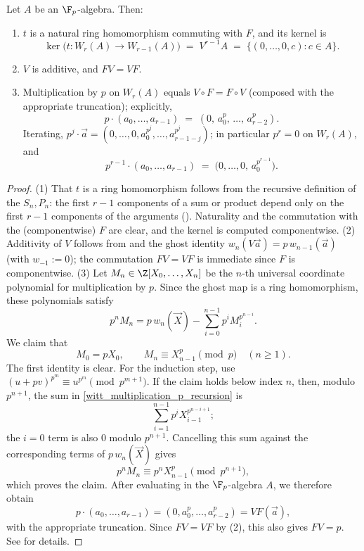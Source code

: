 \begin{prop}\label{prop:witt_multiplication_by_p}
Let $A$ be an $\F_p$-algebra. Then:
\begin{enumerate}
    \item $t$ is a natural ring homomorphism commuting with $F$, and its kernel is
    \[
    \ker\bigl(t \colon W_r(A) \to W_{r-1}(A)\bigr)
    \;=\; V^{r-1} A \;=\; \{(0, \dots, 0, c) : c \in A\}.
    \]
    \item $V$ is additive, and $F V = V F$.
    \item Multiplication by $p$ on $W_r(A)$ equals $V \circ F = F \circ V$
    (composed with the appropriate truncation); explicitly,
    \[
    p \cdot (a_0, \dots, a_{r-1}) \;=\; (0,\, a_0^p,\, \dots,\, a_{r-2}^p).
    \]
    Iterating, $p^j \cdot \vec a = (0, \dots, 0, a_0^{p^j}, \dots, a_{r-1-j}^{p^j})$;
    in particular $p^r = 0$ on $W_r(A)$, and
    \begin{equation}\label{eq:witt_p_to_r_minus_1}
    p^{r-1} \cdot (a_0, \dots, a_{r-1}) \;=\; \bigl(0, \dots, 0,\, a_0^{p^{r-1}}\bigr).
    \end{equation}
\end{enumerate}
\end{prop}

\begin{proof}
(1) That $t$ is a ring homomorphism follows from the recursive definition of the
$S_n, P_n$: the first $r-1$ components of a sum or product depend only on the first
$r-1$ components of the arguments (). Naturality and
the commutation with the (componentwise) $F$ are clear, and the kernel is computed
componentwise. (2) Additivity of $V$ follows from  and
the ghost identity $w_n(V\vec a) = p\, w_{n-1}(\vec a)$ (with $w_{-1} := 0$); the
commutation $FV = VF$ is immediate since $F$ is componentwise. (3) Let
$M_n\in\Z[X_0,\dots,X_n]$ be the $n$-th universal coordinate polynomial for
multiplication by $p$. Since the ghost map is a ring homomorphism, these
polynomials satisfy
\begin{equation}\label{eq:witt_multiplication_p_recursion}
 p^nM_n
 =p\,w_n(\vec X)-\sum_{i=0}^{n-1}p^iM_i^{p^{n-i}}.
\end{equation}
We claim that
\[
 M_0=pX_0,
 \qquad
 M_n\equiv X_{n-1}^p\pmod p\quad(n\geq1).
\]
The first identity is clear. For the induction step, use
$(u+pv)^{p^m}\equiv u^{p^m}\pmod{p^{m+1}}$. If the claim holds below index $n$,
then, modulo $p^{n+1}$, the sum in
\eqref{witt_multiplication_p_recursion} is
\[
 \sum_{i=1}^{n-1}p^iX_{i-1}^{p^{n-i+1}};
\]
the $i=0$ term is also $0$ modulo $p^{n+1}$. Cancelling this sum against the
corresponding terms of $p\,w_n(\vec X)$ gives
\[
 p^nM_n\equiv p^nX_{n-1}^p\pmod{p^{n+1}},
\]
which proves the claim. After evaluating in the $\F_p$-algebra $A$, we therefore
obtain
\[
 p\cdot(a_0,\dots,a_{r-1})=(0,a_0^p,\dots,a_{r-2}^p)=VF(\vec a),
\]
with the appropriate truncation. Since $FV=VF$ by (2), this also gives $FV=p$.
See \cite[II, \S6]{serreLF} for details.
\end{proof}

